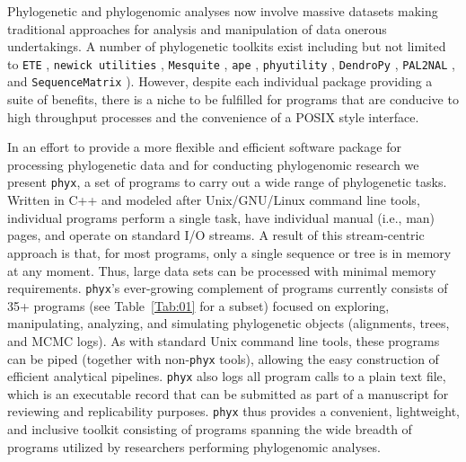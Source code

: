 \documentclass{bioinfo}
\begin{document}
Phylogenetic and phylogenomic analyses now involve massive datasets making traditional approaches for analysis and manipulation of data onerous undertakings. A number of
phylogenetic toolkits exist including but not limited to \texttt{ETE} \citep{HuertaCepas2016}, \texttt{newick utilities} \citep{JunierZdobnov2010}, \texttt{Mesquite}
\citep{MaddisonMaddison2016}, \texttt{ape} \citep{Popescu2012},
\texttt{phyutility} \citep{SmithDunn2008}, \texttt{DendroPy}
\citep{SukumaranHolder2010}, \texttt{PAL2NAL} \citep{Suyama2006}, and
\texttt{SequenceMatrix} \citep{Vaidya2011}).
However, despite each
individual package providing a suite of benefits, there is a niche
to be fulfilled for programs that are conducive to high throughput
processes and the convenience of a POSIX style interface.

In an effort to provide a more flexible and efficient software package for processing phylogenetic data and for conducting phylogenomic research we present \texttt{phyx}, a set of programs to carry
out a wide range of phylogenetic tasks. Written in C++ and modeled after
Unix/GNU/Linux command line tools, individual programs perform a single task,
have individual manual (i.e., man) pages, and operate on standard I/O streams. A result of
this stream-centric approach is that, for most programs, only a single sequence
or tree is in memory at any moment. Thus, large data sets can be
processed with minimal memory requirements. \texttt{phyx}'s
ever-growing complement of programs currently consists of 35+ programs
(see Table~\ref{Tab:01} for a subset) focused on exploring, manipulating, analyzing,
and simulating phylogenetic objects (alignments, trees, and MCMC logs).
As with standard Unix command line tools, these programs can be piped
(together with non-\texttt{phyx} tools), allowing the easy construction
of efficient analytical pipelines. \texttt{phyx} also logs all program calls
to a plain text file, which is an executable record that can be submitted as
part of a manuscript for reviewing and replicability purposes. 
\texttt{phyx} thus provides a convenient, lightweight, and inclusive toolkit consisting of programs spanning the wide breadth of programs utilized by researchers performing phylogenomic analyses. 
\end{document}
